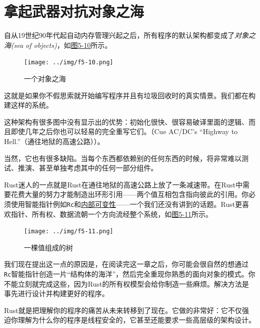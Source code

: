 \clearpage

\section{拿起武器对抗对象之海}

自从19世纪90年代起自动内存管理兴起之后，所有程序的默认架构都变成了\emph{对象之海(sea of objects)}，如\hyperref[f5-10]{图5-10}所示。

\begin{figure}[htbp]
    \centering
    \texttt{[image: ../img/f5-10.png]}
    \caption{一个对象之海}
    \label{f5-10}
\end{figure}

这就是如果你不假思索就开始编写程序并且有垃圾回收时的真实情景。我们都在构建这样的系统。

这种架构有很多图中没有显示出的优势：初始化很快、很容易破译里面的逻辑、而且即使几年之后你也可以轻易的完全重写它们。（Cue AC/DC's “Highway to Hell.”（通往地狱的高速公路））。

当然，它也有很多缺陷。当每个东西都依赖别的任何东西的时候，将非常难以测试、推演、甚至单独考虑其中的任何一部分组件。

Rust迷人的一点就是Rust在通往地狱的高速公路上放了一条减速带。在Rust中需要花费大量的努力才能制造出环形引用——两个值互相包含指向彼此的引用。你必须使用智能指针例如\texttt{Rc}和\hyperref[intermut]{内部可变性}——一个我们还没有讲到的话题。Rust更喜欢指针、所有权、数据流朝一个方向流经整个系统，如\hyperref[f5-11]{图5-11}所示。

\begin{figure}[htbp]
    \centering
    \texttt{[image: ../img/f5-11.png]}
    \caption{一棵值组成的树}
    \label{f5-11}
\end{figure}

我们现在提出这一点的原因是，在阅读完这一章之后，你可能会很自然的想通过\texttt{Rc}智能指针创造一片“结构体的海洋”，然后完全重现你熟悉的面向对象的模式。你不能立刻就完成这些，因为Rust的所有权模型会给你制造一些麻烦。解决方法是事先进行设计并构建更好的程序。

Rust就是把理解你的程序的痛苦从未来转移到了现在。它做的非常好：它不仅强迫你理解为什么你的程序是线程安全的，它甚至还能要求一些高层级的架构设计。
